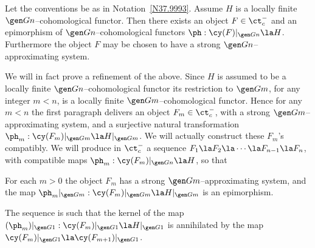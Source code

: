 \documentclass[11pt]{amsart}
\begin{document}
Let the conventions be as in Notation~\ref{N37.9993}. Assume
$H$ is a locally finite $\gen Gn$--cohomological functor.
Then there exists an object
$F\in\ct^-_c$ and an epimorphism of $\gen Gn$--cohomological
functors $\ph:\cy(F)|_{\gen Gn}\la H$. Furthermore the object
$F$ may be chosen to have a strong $\gen Gn$--approximating
system.

We will in fact prove a refinement of the above. Since $H$ is
assumed to be a locally finite $\gen Gn$--cohomological functor its
restriction to $\gen Gm$, for
any integer $m<n$, is a locally finite 
$\gen Gm$--cohomological
functor. Hence for any $m<n$ the first paragraph
delivers an object $F_m\in\ct^-_c$, with a
strong $\gen Gm$--approximating system, and a surjective natural
transformation $\ph_m:\cy(F_m)|_{\gen Gm}\la H|_{\gen Gm}$.
We will actually construct these $F_m$'s compatibly. We will produce
in $\ct^-_c$ a sequence
$F_1\la F_2\la \cdots\la F_{n-1}\la F_n$,
with compatible maps $\ph_m:\cy(F_m)|_{\gen Gn}\la H$, so that
\be
\item
  For each $m>0$ the object $F_m$ has a strong $\gen Gm$--approximating
  system, and
  the map $\ph_m|_{\gen Gm}:\cy(F_m)|_{\gen Gm}\la H|_{\gen Gm}$ is an epimorphism.
\item
  The sequence is such that the kernel
  of the map $(\ph_m)|_{\gen G1}:\cy(F_m)|_{\gen G1}\la H|_{\gen G1}$  
  is annihilated by the map $\cy(F_m)|_{\gen G1}\la\cy(F_{m+1})|_{\gen G1}$.
\setcounter{enumiv}{\value{enumi}}
\ee
\elem
\end{document}
